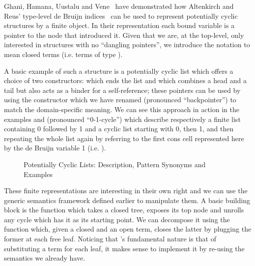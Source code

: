 Ghani, Hamana, Uustalu and Vene~\citeyear{ghani2006representing} have
demonstrated how Altenkirch and Reus' type-level de Bruijn
indices~\citeyear{altenkirch1999monadic} can be used to represent
potentially cyclic structures by a finite object. In their
representation each bound variable is a pointer to the node
that introduced it. Given that we are, at the top-level, only
interested in structures with no ``dangling pointers'', we introduce
the notation   to mean closed terms (i.e. terms of type
   \AIC{[]}).

A basic example of such a structure is a potentially cyclic list which
offers a choice of two constructors: \AIC{[]} which ends the list and
\AIC{\_::\_} which combines a head and a tail but also acts as a binder
for a self-reference; these pointers can be used by using the 
constructor which we have renamed  (pronounced ``backpointer'')
to match the domain-specific meaning.
We can see this approach in action in the examples
\AF{[0, 1]} and  (pronounced ``0-1-cycle'') which describe
respectively a finite list containing
0 followed by 1 and a cyclic list starting with 0, then 1, and then
repeating the whole list again by referring to the first cons cell
represented here by the de Bruijn variable 1 (i.e.  ).

\begin{figure}[h]
\begin{minipage}{0.55\textwidth}
\end{minipage}\hfill
\begin{minipage}{0.35\textwidth}
\end{minipage}
\caption{Potentially Cyclic Lists: Description, Pattern Synonyms and Examples}
\end{figure}

These finite representations are interesting in their own right
and we can use the generic semantics framework defined earlier
to manipulate them. A basic building block is the 
function which takes a closed tree, exposes its top node and
unrolls any cycle which has it as its starting point. We can
decompose it using the  function which, given a closed
and an open term, closes the latter by plugging the former at
each free  leaf. Noticing that 's fundamental nature
is that of substituting a term for each leaf, it makes sense to
implement it by re-using the  semantics we already have.

